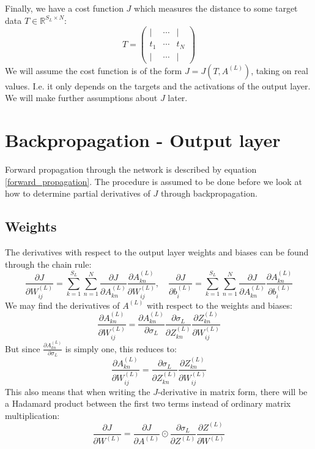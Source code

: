 \documentclass[12pt, a4paper]{article}
\numberwithin{equation}{section}
\begin{document}
Finally, we have a cost function $J$ which measures the distance to some target data $T\in\mathbb{R}^{S_L\times N}$:
\begin{equation}
T=
\begin{pmatrix}
| & \cdots & | \\
t_1 & \cdots & t_N \\
| & \cdots & |
\end{pmatrix}
\end{equation}
We will assume the cost function is of the form $J=J(T,A^{(L)})$, taking on real values. I.e. it only depends on the targets and the activations of the output layer. We will make further assumptions about $J$ later.

\section{Backpropagation - Output layer}
Forward propagation through the network is described by equation \ref{forward_propagation}. The procedure is assumed to be done before we look at how to determine partial derivatives of $J$ through backpropagation.

\subsection{Weights}
The derivatives with respect to the output layer weights and biases can be found through the chain rule:
\begin{equation}
\label{output_grad}
\frac{\partial J}{\partial W^{(L)}_{ij}}=\sum_{k=1}^{S_L}\sum_{n=1}^N\frac{\partial J}{\partial A^{(L)}_{kn}}\frac{\partial A^{(L)}_{kn}}{\partial W^{(L)}_{ij}},\quad\frac{\partial J}{\partial b^{(L)}_i}=\sum_{k=1}^{S_L}\sum_{n=1}^N\frac{\partial J}{\partial A^{(L)}_{kn}}\frac{\partial A^{(L)}_{kn}}{\partial b^{(L)}_i}
\end{equation}
We may find the derivatives of $A^{(L)}$ with respect to the weights and biases:
\begin{equation}
\frac{\partial A^{(L)}_{kn}}{\partial W^{(L)}_{ij}}=\frac{\partial A^{(L)}_{kn}}{\partial\sigma_L}\frac{\partial\sigma_L}{\partial Z^{(L)}_{kn}}\frac{\partial Z^{(L)}_{kn}}{\partial W^{(L)}_{ij}}
\end{equation}
But since $\frac{\partial A^{(L)}_{kn}}{\partial\sigma_L}$ is simply one, this reduces to:
\begin{equation}
\label{output_a_grad}
\frac{\partial A^{(L)}_{kn}}{\partial W^{(L)}_{ij}}=\frac{\partial\sigma_L}{\partial Z^{(L)}_{kn}}\frac{\partial Z^{(L)}_{kn}}{\partial W^{(L)}_{ij}}
\end{equation}
This also means that when writing the $J$-derivative in matrix form, there will be a Hadamard product between the first two terms instead of ordinary matrix multiplication:
\begin{equation}
\label{hadamard_diff}
\frac{\partial J}{\partial W^{(L)}}=\frac{\partial J}{\partial A^{(L)}}\odot\frac{\partial\sigma_L}{\partial Z^{(L)}}\frac{\partial Z^{(L)}}{\partial W^{(L)}}
\end{equation}
\end{document}
